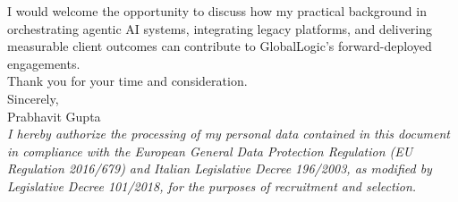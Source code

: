 \documentclass[a4paper,10pt]{article}
\begin{document}
I would welcome the opportunity to discuss how my practical background in orchestrating agentic AI systems, integrating legacy platforms, and delivering measurable client outcomes can contribute to GlobalLogic's forward-deployed engagements.\\[6pt]

Thank you for your time and consideration.\\[6pt]

Sincerely,\\[10pt]

Prabhavit Gupta\\[18pt]

{\footnotesize\textit{I hereby authorize the processing of my personal data contained in this document in compliance with the European General Data Protection Regulation (EU Regulation 2016/679) and Italian Legislative Decree 196/2003, as modified by Legislative Decree 101/2018, for the purposes of recruitment and selection.}}
\end{document}
